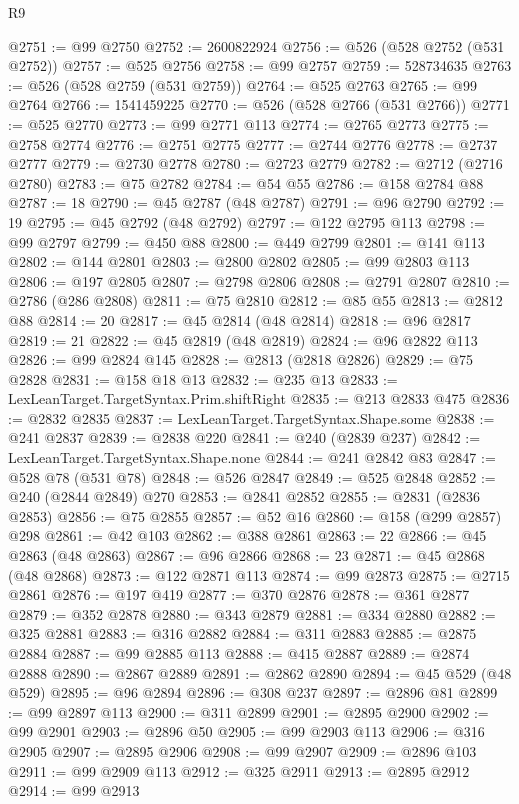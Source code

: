 \begin{lexlean}{R9}
\begin{coremodule}
{{{{{{{{{{{{{{{{{{{{{{{{{{{{{{{{{{{{{{{{{{{{{{{{{{{{{{{{{{{{{{{{{{{{{{{{{{{{{{{{{{{{@2751 := @99 @2750
@2752 := 2600822924
@2756 := @526 (@528 @2752 (@531 @2752))
@2757 := @525 @2756
@2758 := @99 @2757
@2759 := 528734635
@2763 := @526 (@528 @2759 (@531 @2759))
@2764 := @525 @2763
@2765 := @99 @2764
@2766 := 1541459225
@2770 := @526 (@528 @2766 (@531 @2766))
@2771 := @525 @2770
@2773 := @99 @2771 @113
@2774 := @2765 @2773
@2775 := @2758 @2774
@2776 := @2751 @2775
@2777 := @2744 @2776
@2778 := @2737 @2777
@2779 := @2730 @2778
@2780 := @2723 @2779
@2782 := @2712 (@2716 @2780)
@2783 := @75 @2782
@2784 := @54 @55
@2786 := @158 @2784 @88
@2787 := 18
@2790 := @45 @2787 (@48 @2787)
@2791 := @96 @2790
@2792 := 19
@2795 := @45 @2792 (@48 @2792)
@2797 := @122 @2795 @113
@2798 := @99 @2797
@2799 := @450 @88
@2800 := @449 @2799
@2801 := @141 @113
@2802 := @144 @2801
@2803 := @2800 @2802
@2805 := @99 @2803 @113
@2806 := @197 @2805
@2807 := @2798 @2806
@2808 := @2791 @2807
@2810 := @2786 (@286 @2808)
@2811 := @75 @2810
@2812 := @85 @55
@2813 := @2812 @88
@2814 := 20
@2817 := @45 @2814 (@48 @2814)
@2818 := @96 @2817
@2819 := 21
@2822 := @45 @2819 (@48 @2819)
@2824 := @96 @2822 @113
@2826 := @99 @2824 @145
@2828 := @2813 (@2818 @2826)
@2829 := @75 @2828
@2831 := @158 @18 @13
@2832 := @235 @13
@2833 := LexLeanTarget.TargetSyntax.Prim.shiftRight
@2835 := @213 @2833 @475
@2836 := @2832 @2835
@2837 := LexLeanTarget.TargetSyntax.Shape.some
@2838 := @241 @2837
@2839 := @2838 @220
@2841 := @240 (@2839 @237)
@2842 := LexLeanTarget.TargetSyntax.Shape.none
@2844 := @241 @2842 @83
@2847 := @528 @78 (@531 @78)
@2848 := @526 @2847
@2849 := @525 @2848
@2852 := @240 (@2844 @2849) @270
@2853 := @2841 @2852
@2855 := @2831 (@2836 @2853)
@2856 := @75 @2855
@2857 := @52 @16
@2860 := @158 (@299 @2857) @298
@2861 := @42 @103
@2862 := @388 @2861
@2863 := 22
@2866 := @45 @2863 (@48 @2863)
@2867 := @96 @2866
@2868 := 23
@2871 := @45 @2868 (@48 @2868)
@2873 := @122 @2871 @113
@2874 := @99 @2873
@2875 := @2715 @2861
@2876 := @197 @419
@2877 := @370 @2876
@2878 := @361 @2877
@2879 := @352 @2878
@2880 := @343 @2879
@2881 := @334 @2880
@2882 := @325 @2881
@2883 := @316 @2882
@2884 := @311 @2883
@2885 := @2875 @2884
@2887 := @99 @2885 @113
@2888 := @415 @2887
@2889 := @2874 @2888
@2890 := @2867 @2889
@2891 := @2862 @2890
@2894 := @45 @529 (@48 @529)
@2895 := @96 @2894
@2896 := @308 @237
@2897 := @2896 @81
@2899 := @99 @2897 @113
@2900 := @311 @2899
@2901 := @2895 @2900
@2902 := @99 @2901
@2903 := @2896 @50
@2905 := @99 @2903 @113
@2906 := @316 @2905
@2907 := @2895 @2906
@2908 := @99 @2907
@2909 := @2896 @103
@2911 := @99 @2909 @113
@2912 := @325 @2911
@2913 := @2895 @2912
@2914 := @99 @2913
}}}}}}}}}}}}}}}}}}}}}}}}}}}}}}}}}}}}}}}}}}}}}}}}}}}}}}}}}}}}}}}}}}}}}}}}}}}}}}}}}}}}
\end{coremodule}
\end{lexlean}
